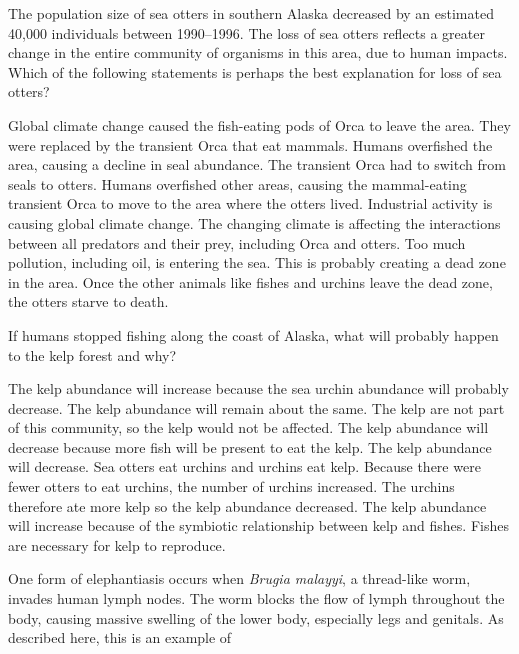 \question
The population size of sea otters in southern Alaska decreased by an estimated 40,000 individuals between 1990--1996. The loss of sea otters reflects a greater change in the entire community of organisms in this area, due to human impacts. Which of the following statements is perhaps the best explanation for loss of sea otters?

\begin{choices}
\choice Global climate change caused the fish-eating pods of Orca to leave the area. They were replaced by the transient Orca that eat mammals.%
\correctchoice Humans overfished the area, causing a decline in seal abundance. The transient Orca had to switch from seals to otters.%
\choice Humans overfished other areas, causing the mammal-eating transient Orca to move to the area where the otters lived.%
\choice Industrial activity is causing global climate change. The changing climate is affecting the interactions between all predators and their prey, including Orca and otters.%
\choice Too much pollution, including oil, is entering the sea. This is probably creating a dead zone in the area. Once the other animals like fishes and urchins leave the dead zone, the otters starve to death.%
\end{choices}

\question
If humans stopped fishing along the coast of Alaska, what will probably happen to the kelp forest and why?

\begin{choices}
\correctchoice The kelp abundance will increase because the sea urchin abundance will probably decrease.%
\choice The kelp abundance will remain about the same. The kelp are not part of this community, so the kelp would not be affected.%
\choice The kelp abundance will decrease because more fish will be present to eat the kelp.%
\choice The kelp abundance will decrease. Sea otters eat urchins and urchins eat kelp. Because there were fewer otters to eat urchins, the number of urchins increased. The urchins therefore ate more kelp so the kelp abundance decreased.%
\choice The kelp abundance will increase because of the symbiotic relationship between kelp and fishes. Fishes are necessary for kelp to reproduce.%
\end{choices}



\question
One form of elephantiasis occurs when \textit{Brugia malayyi}, a thread-like worm, invades human lymph nodes. The worm blocks the flow of lymph throughout the body, causing massive swelling of the lower body, especially legs and genitals. As described here, this is an example of

